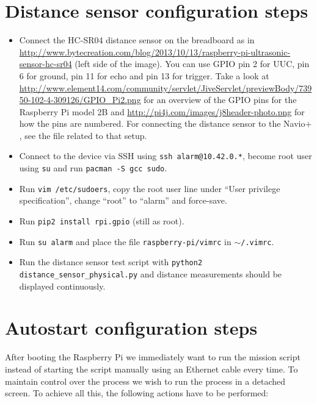 \documentclass{article}
\newcommand{\navio}{Navio$\stackrel{}{+}$}
\begin{document}
\section{Distance sensor configuration steps}
\begin{itemize}
    \item Connect the HC-SR04 distance sensor on the breadboard as in
          \url{http://www.bytecreation.com/blog/2013/10/13/raspberry-pi-ultrasonic-sensor-hc-sr04}
          (left side of the image). You can use GPIO pin 2 for UUC, pin 6 for
          ground, pin 11 for echo and pin 13 for trigger. Take a look at
          \url{http://www.element14.com/community/servlet/JiveServlet/previewBody/73950-102-4-309126/GPIO_Pi2.png}
          for an overview of the GPIO pins for the Raspberry Pi model 2B and
          \url{http://pi4j.com/images/j8header-photo.png} for how the pins are
          numbered. For connecting the distance sensor to the \navio{}, see the 
          file related to that setup.
    \item Connect to the device via SSH using {\tt ssh alarm@10.42.0.*}, become
          root user using {\tt su} and run {\tt pacman -S gcc sudo}.
    \item Run {\tt vim /etc/sudoers}, copy the root user line under ``User
          privilege specification'', change ``root'' to ``alarm'' and
          force-save.
    \item Run {\tt pip2 install rpi.gpio} (still as root).
    \item Run {\tt su alarm} and place the file {\tt raspberry-pi/vimrc} in
          {\tt $\sim$/.vimrc}.
    \item Run the distance sensor test script with {\tt python2 
          distance\_sensor\_physical.py}
          and distance measurements should be displayed continuously.
\end{itemize}

\section{Autostart configuration steps}
After booting the Raspberry Pi we immediately want to run the mission script 
instead of starting the script manually using an Ethernet cable every time. To 
maintain control over the process we wish to run the process in a detached 
screen. To achieve all this, the following actions have to be performed:
\end{document}
